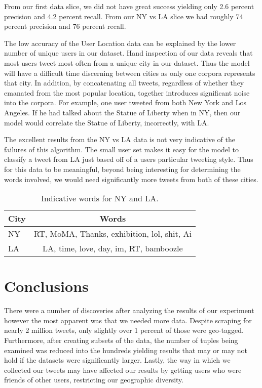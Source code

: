 \documentclass[12pt]{article}
\begin{document}
From our first data slice, we did not have great success yielding only 2.6 percent precision and 4.2 percent recall.  From our NY vs LA slice we had roughly 74 percent precision and 76 percent recall. 

The low accuracy of the User Location data can be explained by the lower number of unique users in our dataset. Hand inspection of our data reveals that most users tweet most often from a unique city in our dataset. Thus the model will have a difficult time discerning between cities as only one corpora represents that city. In addition, by concatenating all tweets, regardless of whether they emanated from the most popular location, together introduces significant noise into the corpora. For example, one user tweeted from both New York and Los Angeles. If he had talked about the Statue of Liberty when in NY, then our model would correlate the Statue of Liberty, incorrectly, with LA.

The excellent results from the NY vs LA data is not very indicative of the failures of this algorithm. The small user set makes it easy for the model to classify a tweet from LA just based off of a users particular tweeting style. Thus for this data to be meaningful, beyond being interesting for determining the words involved, we would need significantly more tweets from both of these cities. 


\begin{table}
	\begin{center}
		\begin{tabular}{| l || c |}
			\hline
			City & Words \\ \hline
			NY & RT, MoMA, Thanks, exhibition, lol, shit, Ai \\ \hline
			LA & LA, time, love, day, im, RT, bamboozle \\ 
			\hline
		\end{tabular}
	\end{center}
	\caption{Indicative words for NY and LA.}
	\label{table:poploc}
\end{table}

\section*{Conclusions}
There were a number of discoveries after analyzing the results of our experiment however the most apparent was that we needed more data.  Despite scraping for nearly 2 million tweets, only slightly over 1 percent of those were geo-tagged.  Furthermore, after creating subsets of the data, the number of tuples being examined was reduced into the hundreds yielding results that may or may not hold if the datasets were significantly larger.  Lastly, the way in which we collected our tweets may have affected our results by getting users who were friends of other users, restricting our geographic diversity.  
\end{document}
